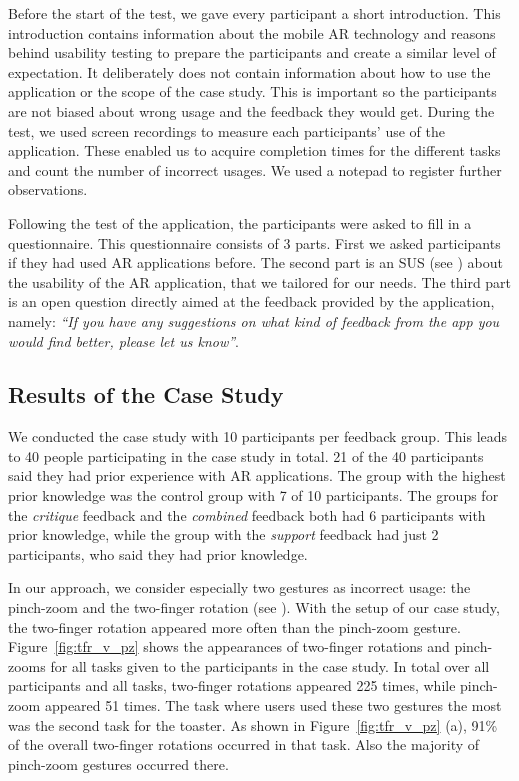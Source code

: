 \documentclass[manuscript]{acmart}
\begin{document}
			Before the start of the test, we gave every participant a short introduction. This introduction contains information about the mobile \ac{AR} technology and reasons behind usability testing to prepare the participants and create a similar level of expectation. It deliberately does not contain information about how to use the application or the scope of the case study. This is important so the participants are not biased about wrong usage and the feedback they would get. During the test, we used screen recordings to measure each participants' use of the application. These enabled us to acquire completion times for the different tasks and count the number of incorrect usages. We used a notepad to register further observations.

			Following the test of the application, the participants were asked to fill in a questionnaire. This questionnaire consists of 3 parts. First we asked participants if they had used \ac{AR} applications before. The second part is an \ac{SUS} (see \emph{}) about the usability of the \ac{AR} application, that we tailored for our needs. The third part is an open question directly aimed at the feedback provided by the application, namely: \emph{``If you have any suggestions on what kind of feedback from the app you would find better, please let us know''}.

		\subsection{Results of the Case Study}\label{ssec:results}
			We conducted the case study with 10 participants per feedback group. This leads to 40 people participating in the case study in total. 21 of the 40 participants said they had prior experience with \ac{AR} applications. The group with the highest prior knowledge was the control group with 7 of 10 participants. The groups for the \emph{critique} feedback and the \emph{combined} feedback both had 6 participants with prior knowledge, while the group with the \emph{support} feedback had just 2 participants, who said they had prior knowledge.

			In our approach, we consider especially two gestures as incorrect usage: the pinch-zoom and the two-finger rotation (see \emph{}). With the setup of our case study, the two-finger rotation appeared more often than the pinch-zoom gesture. Figure~\ref{fig:tfr_v_pz} shows the appearances of two-finger rotations and pinch-zooms for all tasks given to the participants in the case study. In total over all participants and all tasks, two-finger rotations appeared 225 times, while pinch-zoom appeared 51 times. The task where users used these two gestures the most was the second task for the toaster. As shown in Figure~\ref{fig:tfr_v_pz} (a), 91\% of the overall two-finger rotations occurred in that task. Also the majority of pinch-zoom gestures occurred there.
\end{document}
